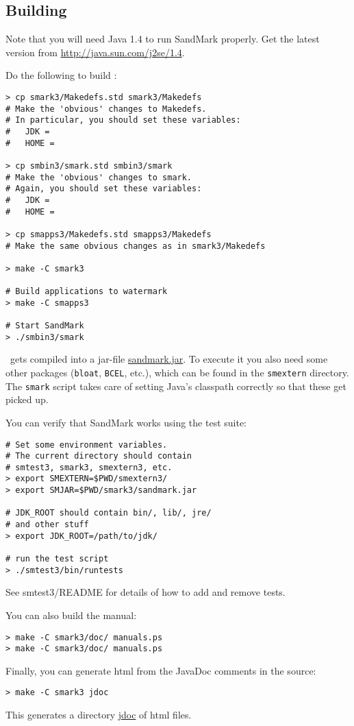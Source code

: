 \subsection{Building \SM}
Note that you will need Java 1.4 to run SandMark properly.
Get the latest version from \url{http://java.sun.com/j2se/1.4}.

Do the following to build \SM:
\begin{verbatim}
> cp smark3/Makedefs.std smark3/Makedefs
# Make the 'obvious' changes to Makedefs.
# In particular, you should set these variables:
#   JDK =
#   HOME = 

> cp smbin3/smark.std smbin3/smark
# Make the 'obvious' changes to smark.
# Again, you should set these variables:
#   JDK =
#   HOME = 

> cp smapps3/Makedefs.std smapps3/Makedefs
# Make the same obvious changes as in smark3/Makedefs

> make -C smark3

# Build applications to watermark
> make -C smapps3

# Start SandMark
> ./smbin3/smark
\end{verbatim}

\SM\ gets compiled into a jar-file \url{sandmark.jar}.
To execute it you also need some other packages ({\tt bloat},
{\tt BCEL}, etc.), which can be found in the {\tt smextern}
directory. The {\tt smark} script takes care of setting
Java's classpath correctly so that these get picked up.

You can verify that SandMark works using the test suite:

\begin{verbatim}
# Set some environment variables.
# The current directory should contain
# smtest3, smark3, smextern3, etc.
> export SMEXTERN=$PWD/smextern3/
> export SMJAR=$PWD/smark3/sandmark.jar

# JDK_ROOT should contain bin/, lib/, jre/
# and other stuff
> export JDK_ROOT=/path/to/jdk/

# run the test script
> ./smtest3/bin/runtests
\end{verbatim}

See smtest3/README for details of how to add and remove tests.

You can also build the manual:
\begin{verbatim}
> make -C smark3/doc/ manuals.ps
> make -C smark3/doc/ manuals.ps
\end{verbatim}

Finally, you can generate html from the JavaDoc
comments in the source:
\begin{verbatim}
> make -C smark3 jdoc
\end{verbatim}
This generates a directory \url{jdoc} of html files.

